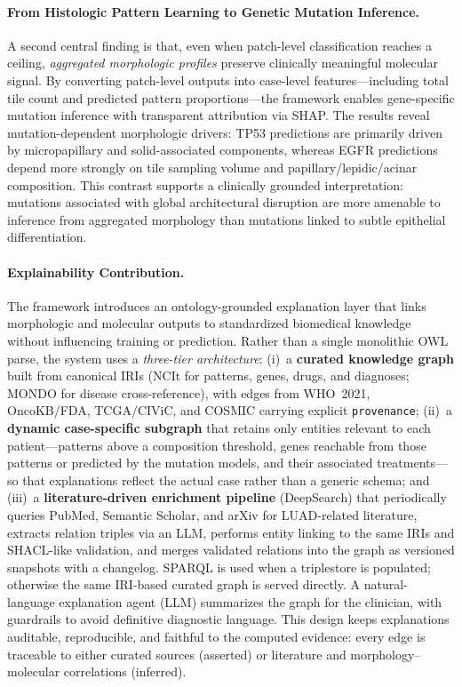 \paragraph{From Histologic Pattern Learning to Genetic Mutation Inference.}
A second central finding is that, even when patch-level classification reaches a ceiling, \emph{aggregated morphologic profiles} preserve clinically meaningful molecular signal. By converting patch-level outputs into case-level features---including total tile count and predicted pattern proportions---the framework enables gene-specific mutation inference with transparent attribution via SHAP. The results reveal mutation-dependent morphologic drivers: TP53 predictions are primarily driven by micropapillary and solid-associated components, whereas EGFR predictions depend more strongly on tile sampling volume and papillary/lepidic/acinar composition. This contrast supports a clinically grounded interpretation: mutations associated with global architectural disruption are more amenable to inference from aggregated morphology than mutations linked to subtle epithelial differentiation.

\paragraph{Explainability Contribution.}
The framework introduces an ontology-grounded explanation layer that links morphologic and molecular outputs to standardized biomedical knowledge without influencing training or prediction. Rather than a single monolithic OWL parse, the system uses a \emph{three-tier architecture}: (i)~a \textbf{curated knowledge graph} built from canonical IRIs (NCIt for patterns, genes, drugs, and diagnoses; MONDO for disease cross-reference), with edges from WHO~2021, OncoKB/FDA, TCGA/CIViC, and COSMIC carrying explicit \texttt{provenance}; (ii)~a \textbf{dynamic case-specific subgraph} that retains only entities relevant to each patient---patterns above a composition threshold, genes reachable from those patterns or predicted by the mutation models, and their associated treatments---so that explanations reflect the actual case rather than a generic schema; and (iii)~a \textbf{literature-driven enrichment pipeline} (DeepSearch) that periodically queries PubMed, Semantic Scholar, and arXiv for LUAD-related literature, extracts relation triples via an LLM, performs entity linking to the same IRIs and SHACL-like validation, and merges validated relations into the graph as versioned snapshots with a changelog. SPARQL is used when a triplestore is populated; otherwise the same IRI-based curated graph is served directly. A natural-language explanation agent (LLM) summarizes the graph for the clinician, with guardrails to avoid definitive diagnostic language. This design keeps explanations auditable, reproducible, and faithful to the computed evidence: every edge is traceable to either curated sources (asserted) or literature and morphology--molecular correlations (inferred).

